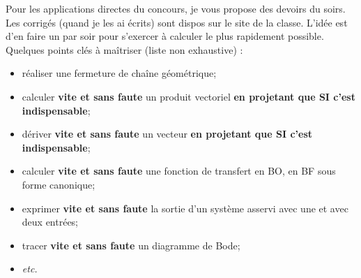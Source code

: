 Pour les applications directes du concours, je vous propose des devoirs du soirs. Les corrigés (quand je les ai écrits) sont dispos sur le site de la classe. L'idée est d'en faire un par soir pour s'exercer à calculer le plus rapidement possible. Quelques points clés à maîtriser (liste non exhaustive) : 
\begin{itemize}
\item réaliser une fermeture de chaîne géométrique;
\item calculer \textbf{vite et sans faute} un produit vectoriel \textbf{en projetant que SI c'est indispensable};
\item dériver \textbf{vite et sans faute} un vecteur \textbf{en projetant que SI c'est indispensable};
\item calculer \textbf{vite et sans faute} une fonction de transfert en BO, en BF sous forme canonique;
\item exprimer \textbf{vite et sans faute} la sortie d'un système asservi avec une et avec deux entrées;
\item tracer \textbf{vite et sans faute} un diagramme de Bode;
\item \textit{etc.}
\end{itemize}
%

